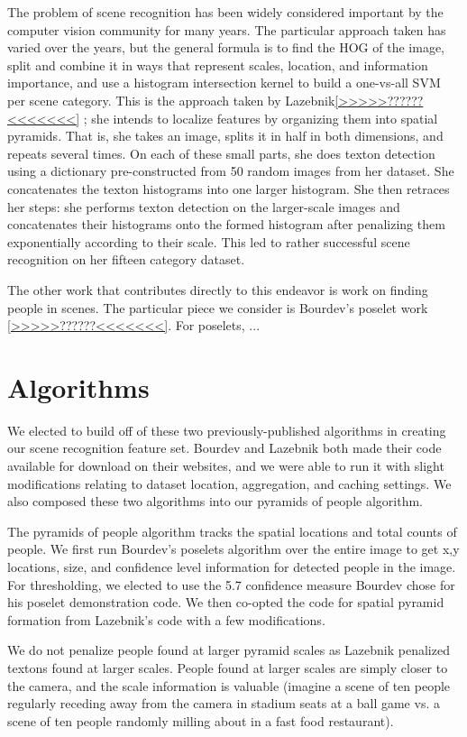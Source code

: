 \documentclass[11pt]{article}
\begin{document}
The problem of scene recognition has been widely considered important by the computer vision community for many years.  The particular approach taken has varied over the years, but the general formula is to find the HOG of the image, split and combine it in ways that represent scales, location, and information importance, and use a histogram intersection kernel to build a one-vs-all SVM per scene category.  This is the approach taken by Lazebnik\ref{>>>>>??????<<<<<<<} ; she intends to localize features by organizing them into spatial pyramids.  That is, she takes an image, splits it in half in both dimensions, and repeats several times.  On each of these small parts, she does texton detection using a dictionary pre-constructed from 50 random images from her dataset.  She concatenates the texton histograms into one larger histogram.  She then retraces her steps: she performs texton detection on the larger-scale images and concatenates their histograms onto the formed histogram after penalizing them exponentially according to their scale.  This led to rather successful scene recognition on her fifteen category dataset.

The other work that contributes directly to this endeavor is work on finding people in scenes.  The particular piece we consider is Bourdev's poselet work \ref{>>>>>??????<<<<<<<}.  For poselets, ...

\section{Algorithms}

We elected to build off of these two previously-published algorithms in creating our scene recognition feature set.  Bourdev and Lazebnik both made their code available for download on their websites, and we were able to run it with slight modifications relating to dataset location, aggregation, and caching settings.  We also composed these two algorithms into our pyramids of people algorithm.

The pyramids of people algorithm tracks the spatial locations and total counts of people.  We first run Bourdev's poselets algorithm over the entire image to get x,y locations, size, and confidence level information for detected people in the image.  For thresholding, we elected to use the 5.7 confidence measure Bourdev chose for his poselet demonstration code.  We then co-opted the code for spatial pyramid formation from Lazebnik's code with a few modifications.

We do not penalize people found at larger pyramid scales as Lazebnik penalized textons found at larger scales.  People found at larger scales are simply closer to the camera, and the scale information is valuable (imagine a scene of ten people regularly receding away from the camera in stadium seats at a ball game vs. a scene of ten people randomly milling about in a fast food restaurant).
\end{document}
